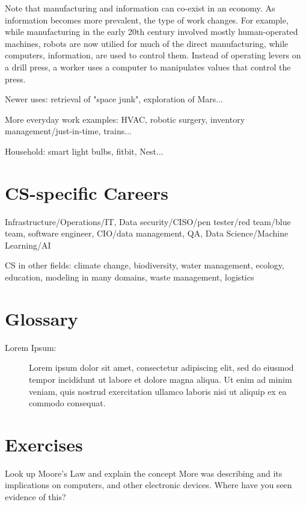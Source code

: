 Note that manufacturing and information can co-exist in an economy. As information becomes more prevalent, the type of work changes. For example, while manufacturing in the early 20th century involved mostly human-operated machines, robots are now utilied for much of the direct manufacturing, while computers, information, are used to control them. Instead of operating levers on a drill press, a worker uses a computer to manipulates values that control the press.

Newer uses: retrieval of "space junk", exploration of Mars...

More everyday work examples: HVAC, robotic surgery, inventory management/just-in-time, trains...

Household: smart light bulbs, fitbit, Nest...

	
\section{CS-specific Careers}

Infrastructure/Operations/IT, Data security/CISO/pen tester/red team/blue team, software engineer, CIO/data management, QA, Data Science/Machine Learning/AI

CS in other fields: climate change, biodiversity, water management, ecology, education, modeling in many domains, waste management, logistics



\section{Glossary}

\begin{description}
	
	\item[Lorem Ipsum:]  Lorem ipsum dolor sit amet, consectetur adipiscing elit, sed do eiusmod tempor incididunt ut labore et dolore magna aliqua. Ut enim ad minim veniam, quis nostrud exercitation ullamco laboris nisi ut aliquip ex ea commodo consequat.
	
\end{description}

\section{Exercises}

\begin{ex}
	Look up Moore's Law and explain the concept More was describing and its implications on computers, and other electronic devices. Where have you seen evidence of this?	
\end{ex}

